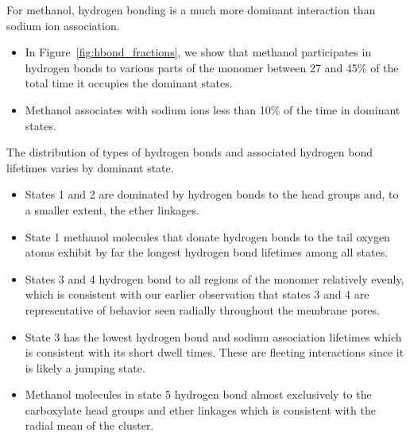 \documentclass[journal=jpcbfk,manuscript=article]{achemso}
\begin{document}
  For methanol, hydrogen bonding is a much more dominant interaction than sodium
  ion association. 
  \begin{itemize}
    \item In Figure~\ref{fig:hbond_fractions}, we show that methanol participates
    in hydrogen bonds to various parts of the monomer between 27 and 45\% of the
    total time it occupies the dominant states.
    \item Methanol associates with sodium ions less than 10\% of the time in 
    dominant states.
  \end{itemize}  
  
  The distribution of types of hydrogen bonds and associated hydrogen bond lifetimes
  varies by dominant state.
  \begin{itemize}
    \item States 1 and 2 are dominated by hydrogen bonds to the head groups and, to 
    a smaller extent, the ether linkages.
    \item State 1 methanol molecules that donate hydrogen bonds to the tail oxygen 
    atoms exhibit by far the longest hydrogen bond lifetimes among all states.
    \item States 3 and 4 hydrogen bond to all regions of the monomer relatively 
    evenly, which is consistent with our earlier observation that states 3 and 4
    are representative of behavior seen radially throughout the membrane pores.
    \item State 3 has the lowest hydrogen bond and sodium association lifetimes 
    which is consistent with its short dwell times. These are fleeting interactions
    since it is likely a jumping state.
    \item Methanol molecules in state 5 hydrogen bond almost exclusively to the 
    carboxylate head groups and ether linkages which is consistent with the radial
    mean of the cluster.
  \end{itemize}
  
\end{document}

